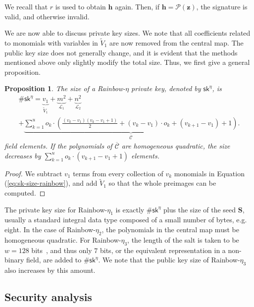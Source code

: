 \documentclass[12pt, a4paper, oneside]{memoir}
\newtheorem{proposition}[theorem]{Proposition}
\theoremstyle{definition}
\begin{document}
We recall that $r$ is used to obtain $\mathbf{h}$ again. Then, if $\mathbf{h} = \mathcal{P}(\mathbf{z})$, the signature is valid, and otherwise invalid.

We are now able to discuss private key sizes. We note that all coefficients related to monomials with variables in $\widetilde{V}_{1}$ are now removed from the central map. The public key size does not generally change, and it is evident that the methods mentioned above only slightly modify the total size. Thus, we first give a general proposition.

\begin{proposition}\label{prop:eta-key-size}
  The size of a Rainbow-$\eta$ private key, denoted by $\mathsf{sk}^{\eta}$, is
  \begin{multline}
    \#\mathsf{sk}^{\eta} = \underbrace{v_{1}}_{\widetilde{V}_{1}}
      + \underbrace{m^{2}}_{\mathcal{L}_{1}}
      + \underbrace{n^{2}}_{\mathcal{L}_{2}} \\
      + \underbrace{\sum_{k = 1}^{u} o_{k} \cdot \left( \frac{(v_{k} - v_{1})(v_{k} - v_{1} + 1)}{2}
        + (v_{k} - v_{1}) \cdot o_{k} + (v_{k + 1} - v_{1}) + 1 \right)}_{\overline{\mathcal{C}}}.
  \end{multline}
  field elements. If the polynomials of $\overline{\mathcal{C}}$ are homogeneous quadratic, the size decreases by $\sum_{k = 1}^{u} o_{k} \cdot (v_{k + 1} - v_{1} + 1)$ elements.
\end{proposition}
\begin{proof}
  We subtract $v_{1}$ terms from every collection of $v_{k}$ monomials in Equation (\ref{eq:sk-size-rainbow}), and add $\widetilde{V}_{1}$ so that the whole preimages can be computed.
\end{proof}

The private key size for Rainbow-$\eta_{1}$ is exactly $\#\mathsf{sk}^{\eta}$ plus the size of the seed $\mathbf{S}$, usually a standard integral data type composed of a small number of bytes, e.g. eight. In the case of Rainbow-$\eta_{2}$, the polynomials in the central map must be homogeneous quadratic. For Rainbow-$\eta_{3}$, the length of the salt is taken to be $w = 128$ bits~\cite[p.~11]{Ding:201901}, and thus only $7$ bits, or the equivalent representation in a non-binary field, are added to $\#\mathsf{sk}^{\eta}$. We note that the public key size of Rainbow-$\eta_{3}$ also increases by this amount.

\subsection{Security analysis}\label{subsec:analysis}
\end{document}
